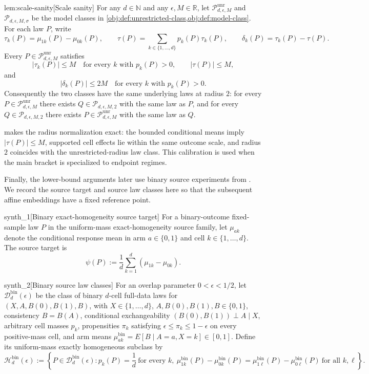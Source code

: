 \begin{lemmav}{lem:scale-sanity}[Scale sanity]
For any \(d\in\mathbb N\) and any \(\epsilon,M\in\mathbb R\), let \(\mathcal P_{d,\epsilon,M}^{\mathrm{unr}}\) and \(\mathcal P_{d,\epsilon,M,\sigma}\) be the model classes in \cref{obj:def:unrestricted-class,obj:def:model-class}. For each law \(P\), write
\[
\tau_k(P)=\mu_{1k}(P)-\mu_{0k}(P),
\qquad
\tau(P)=\sum_{k\in\{1,\ldots,d\}} p_k(P)\tau_k(P),
\qquad
\delta_k(P)=\tau_k(P)-\tau(P).
\]
Every \(P\in\mathcal P_{d,\epsilon,M}^{\mathrm{unr}}\) satisfies
\[
|\tau_k(P)|\le M\quad\text{for every }k\text{ with }p_k(P)>0,
\qquad
|\tau(P)|\le M,
\]
and
\[
|\delta_k(P)|\le 2M\quad\text{for every }k\text{ with }p_k(P)>0.
\]
Consequently the two classes have the same underlying laws at radius \(2\): for every \(P\in\mathcal P_{d,\epsilon,M}^{\mathrm{unr}}\) there exists \(Q\in\mathcal P_{d,\epsilon,M,2}\) with the same law as \(P\), and for every \(Q\in\mathcal P_{d,\epsilon,M,2}\) there exists \(P\in\mathcal P_{d,\epsilon,M}^{\mathrm{unr}}\) with the same law as \(Q\).
\end{lemmav}

 makes the radius normalization exact: the bounded conditional means imply \(|\tau(P)|\le M\), supported cell effects lie within the same outcome scale, and radius \(2\) coincides with the unrestricted-radius law class. This calibration is used when the main bracket is specialized to endpoint regimes.

Finally, the lower-bound arguments later use binary source experiments from \citet{ZengBalakrishnanHanKennedy2024}. We record the source target and source law classes here so that the subsequent affine embeddings have a fixed reference point.

\begin{definitionv}{synth_1}[Binary exact-homogeneity source target]
For a binary-outcome fixed-sample law \(P\) in the uniform-mass exact-homogeneity source family, let \(\mu_{ak}\) denote the conditional response mean in arm \(a\in\{0,1\}\) and cell \(k\in\{1,\ldots,d\}\). The source target is\[\psi(P):=\frac{1}{d}\sum_{k=1}^{d}(\mu_{1k}-\mu_{0k}).\]
\end{definitionv}

\begin{definitionv}{synth_2}[Binary source law classes]
For an overlap parameter \(0<\epsilon<1/2\), let \(\mathcal D_d^{\mathrm{bin}}(\epsilon)\) be the class of binary \(d\)-cell full-data laws for \((X,A,B(0),B(1),B)\), with \(X\in\{1,\ldots,d\}\), \(A,B(0),B(1),B\in\{0,1\}\), consistency \(B=B(A)\), conditional exchangeability \((B(0),B(1))\perp A\mid X\), arbitrary cell masses \(p_k\), propensities \(\pi_k\) satisfying \(\epsilon\le\pi_k\le1-\epsilon\) on every positive-mass cell, and arm means \(\mu_{ak}^{\mathrm{bin}}=E[B\mid A=a,X=k]\in[0,1]\). Define its uniform-mass exactly homogeneous subclass by
\[
\mathcal H_d^{\mathrm{bin}}(\epsilon)
:=
\left\{
P\in\mathcal D_d^{\mathrm{bin}}(\epsilon):
p_k(P)=\frac1d\ \text{for every }k,\ 
\mu_{1k}^{\mathrm{bin}}(P)-\mu_{0k}^{\mathrm{bin}}(P)
=
\mu_{1\ell}^{\mathrm{bin}}(P)-\mu_{0\ell}^{\mathrm{bin}}(P)
\ \text{for all }k,\ell
\right\}.
\]
\end{definitionv}

